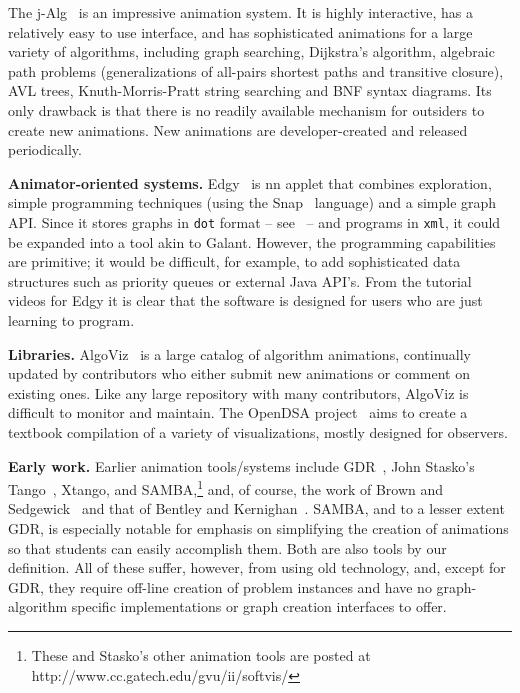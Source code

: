 The j-Alg~\cite{j-Algo} is an impressive animation system.
It is highly interactive, has a relatively easy to use interface, and has sophisticated animations for a large variety of algorithms,
including graph searching, Dijkstra's algorithm,
algebraic path problems (generalizations of all-pairs shortest paths and transitive closure), AVL trees, Knuth-Morris-Pratt string searching and BNF syntax diagrams.
Its only drawback is that there is no readily available mechanism
for outsiders to create new animations.
New animations are developer-created and released periodically.

\textbf{Animator-oriented systems.}
Edgy~\cite{Edgy} is nn applet that combines exploration, simple programming techniques
(using the Snap~\cite{Snap} language) and a simple graph API.
Since it stores graphs in \texttt{dot} format -- see~\cite{GraphViz} --
and programs in \texttt{xml},
it could be expanded into a tool akin to Galant.
However, the programming capabilities are primitive;
it would be difficult, for example, to add sophisticated data structures such as
priority queues or external Java API's.
From the tutorial videos for Edgy it is clear that the software is designed
for users who are just learning to program.

\textbf{Libraries.}
AlgoViz~\cite{AlgoViz}
is a large catalog of algorithm animations, continually updated by
contributors who either submit new animations or comment on existing ones.
Like any large repository with many contributors, AlgoViz is difficult to
monitor and
maintain.
The OpenDSA project~\cite{%
2011-ProgramVisualization-Shaffer,2011-Koli-Shaffer,2012-SIGCSE-Fouh%
}
aims to create a textbook compilation of a variety of
visualizations, mostly designed for observers.

\textbf{Early work.}
Earlier animation tools/systems include GDR~\cite{1992-CSDM-Stallmann}, John Stasko's
Tango~\cite{1990-Computer-Stasko}, Xtango,
and SAMBA,\footnote{
These and Stasko's other animation tools are posted at
http://www.cc.gatech.edu/gvu/ii/softvis/
} and, of course,
the work of
Brown and Sedgewick~\cite{1988-Computer-Brown,1985-IEEE_Software-Brown}
and that of Bentley and Kernighan~\cite{1987-Animation-Bentley}.
SAMBA, and to a lesser extent GDR, is especially notable for emphasis on simplifying the creation of
animations so that students can easily accomplish them.
Both are also tools by our definition.
All of these suffer, however, from using old technology,
and, except for GDR,
they require off-line creation
of problem instances and have no graph-algorithm specific implementations
or graph creation interfaces to offer.

